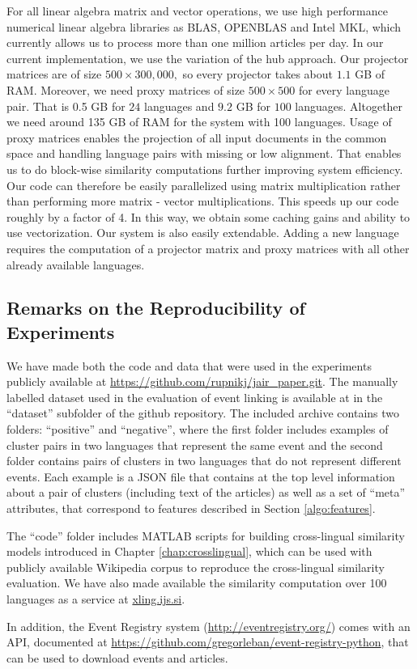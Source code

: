 For all linear algebra matrix and vector operations, we use high performance numerical
linear algebra libraries as BLAS, OPENBLAS and Intel MKL, which currently allows
us to process more than one million articles per day.
In our current implementation, we use the variation of the hub approach. Our projector
matrices are of size $500\times 300,000,$ so every projector takes about $1.1$ GB of RAM.
Moreover, we need proxy matrices of size $500\times500$ for every language pair. That
is 0.5 GB for $24$ languages and $9.2$ GB for $100$ languages. Altogether we need
around 135 GB of RAM for the system with 100 languages.
Usage of proxy matrices enables the projection of all input documents in the common
space and handling language pairs with missing or low alignment. That enables us to
do block-wise similarity computations further improving system efficiency. Our code
can therefore be easily parallelized using matrix multiplication rather than performing
more matrix - vector multiplications. This speeds up our code roughly by a factor of 4. In
this way, we obtain some caching gains and ability to use vectorization.
Our system is also easily extendable. Adding a new language requires the computation of
a projector matrix and proxy matrices with all other already available languages. 

\subsection{Remarks on the Reproducibility of Experiments}
We have made  both the code and data that were used in the experiments publicly available at \url{https://github.com/rupnikj/jair_paper.git}.
The manually labelled dataset used in the evaluation of event linking is available at in the ``dataset'' subfolder of the github repository. The included archive contains two folders: ``positive'' and ``negative'', where the first folder includes examples of cluster pairs in two languages that represent the same event and the second folder contains pairs of clusters in two languages that do not represent different events. Each example is a JSON file that contains at the top level information about a pair of clusters (including text of the articles) as well as a set of ``meta'' attributes, that correspond to features described in Section \ref{algo:features}.

The ``code'' folder includes MATLAB scripts for building cross-lingual similarity models introduced in Chapter \ref{chap:crosslingual}, which can be used with publicly available Wikipedia corpus to reproduce the cross-lingual similarity evaluation. We have also made available the similarity computation over 100 languages as a service at \url{xling.ijs.si}.

In addition, the Event Registry system (\url{http://eventregistry.org/}) comes with an API, documented at \url{https://github.com/gregorleban/event-registry-python}, that can be used to download events and articles. 